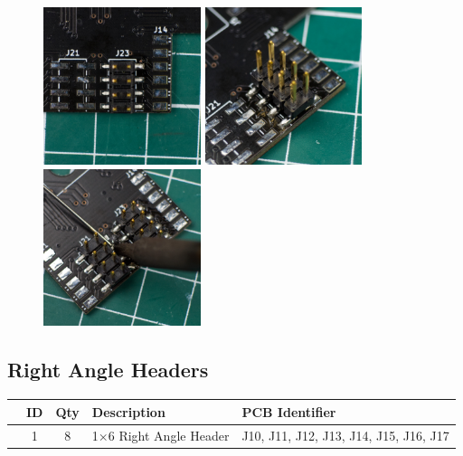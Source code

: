 \documentclass[12pt, a4paper]{article}
\newcommand{\checkbox}[1]{\CheckBox[backgroundcolor=0.86 0.828 0.71, name=#1]{}}
\begin{document}
\begin{figure}[H]
    \centering
    \includegraphics[width=46mm]{images/section_2-1_single.jpg}
    \hspace{2mm}
    \includegraphics[width=46mm]{images/section_2-1_full.jpg}
    \hspace{2mm}
    \includegraphics[width=46mm]{images/section_2-1_top.jpg}
\end{figure}

\pagebreak
\subsection{Right Angle Headers}

\begin{center}
    \small
    \setlength\extrarowheight{8pt}
    \begin{tabularx}{\textwidth}{|c|c|c|X|l|}
        \hline\rowcolor{lightgray} & ID & Qty & Description & PCB Identifier\\
        \hline\checkbox{ga} & 1 & 8 & 1×6 Right Angle Header & J10, J11, J12, J13, J14, J15, J16, J17\\
        \hline
    \end{tabularx}
\end{center}
\end{document}

